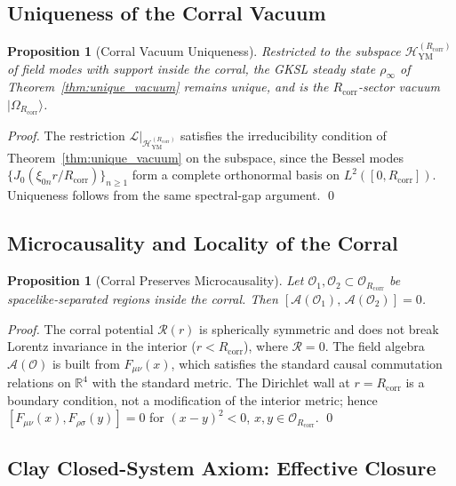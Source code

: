\documentclass[12pt,a4paper]{article}
\newtheorem{proposition}[theorem]{Proposition}
\theoremstyle{definition}
\newcommand{\YM}{\mathrm{YM}}
\newcommand{\hilb}{\mathscr{H}}
\newcommand{\Rcorr}{R_{\mathrm{corr}}}
\begin{document}
\subsection{Uniqueness of the Corral Vacuum}
\label{subsec:corral_vacuum}

\begin{proposition}[Corral Vacuum Uniqueness]
\label{prop:corral_vacuum}
Restricted to the subspace $\hilb_{\YM}^{(\Rcorr)}$ of field modes with
support inside the corral, the GKSL steady state $\rho_{\infty}$ of
Theorem~\ref{thm:unique_vacuum} remains unique, and is the
$\Rcorr$-sector vacuum $|\Omega_{\Rcorr}\rangle$.
\end{proposition}

\begin{proof}
The restriction $\mathcal{L}|_{\hilb_{\YM}^{(\Rcorr)}}$ satisfies the
irreducibility condition of Theorem~\ref{thm:unique_vacuum} on the
subspace, since the Bessel modes $\{J_{0}(\xi_{0n}r/\Rcorr)\}_{n \geq 1}$
form a complete orthonormal basis on $L^{2}([0,\Rcorr])$.
Uniqueness follows from the same spectral-gap argument.
\qed
\end{proof}

\subsection{Microcausality and Locality of the Corral}
\label{subsec:causality}

\begin{proposition}[Corral Preserves Microcausality]
\label{prop:causality}
Let $\mathcal{O}_{1}, \mathcal{O}_{2} \subset \mathcal{O}_{\Rcorr}$
be spacelike-separated regions inside the corral.
Then
$[\mathcal{A}(\mathcal{O}_{1}),\, \mathcal{A}(\mathcal{O}_{2})] = 0$.
\end{proposition}

\begin{proof}
The corral potential $\mathcal{R}(r)$ is spherically symmetric and does
not break Lorentz invariance in the interior ($r < \Rcorr$), where
$\mathcal{R} = 0$. The field algebra $\mathcal{A}(\mathcal{O})$ is
built from $F_{\mu\nu}(x)$, which satisfies the standard causal
commutation relations on $\mathbb{R}^{4}$ with the standard metric.
The Dirichlet wall at $r = \Rcorr$ is a boundary condition, not a
modification of the interior metric; hence
$[F_{\mu\nu}(x), F_{\rho\sigma}(y)] = 0$ for $(x-y)^{2} < 0$,
$x, y \in \mathcal{O}_{\Rcorr}$.
\qed
\end{proof}

\subsection{Clay Closed-System Axiom: Effective Closure}
\end{document}
